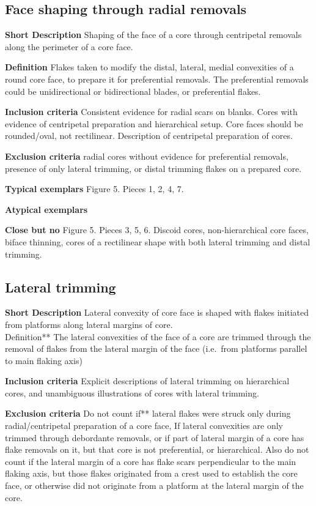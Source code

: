 \documentclass[
]{article}
\begin{document}
\hypertarget{face-shaping-through-radial-removals}{%
\subsection{Face shaping through radial
removals}\label{face-shaping-through-radial-removals}}

\textbf{Short Description} Shaping of the face of a core through
centripetal removals along the perimeter of a core face.

\textbf{Definition} Flakes taken to modify the distal, lateral, medial
convexities of a round core face, to prepare it for preferential
removals. The preferential removals could be unidirectional or
bidirectional blades, or preferential flakes.

\textbf{Inclusion criteria} Consistent evidence for radial scars on
blanks. Cores with evidence of centripetal preparation and hierarchical
setup. Core faces should be rounded/oval, not rectilinear. Description
of centripetal preparation of cores.

\textbf{Exclusion criteria} radial cores without evidence for
preferential removals, presence of only lateral trimming, or distal
trimming flakes on a prepared core.

\textbf{Typical exemplars} Figure 5. Pieces 1, 2, 4, 7.

\textbf{Atypical exemplars}

\textbf{Close but no} Figure 5. Pieces 3, 5, 6. Discoid cores,
non-hierarchical core faces, biface thinning, cores of a rectilinear
shape with both lateral trimming and distal trimming.

\hypertarget{lateral-trimming}{%
\subsection{Lateral trimming}\label{lateral-trimming}}

\textbf{Short Description} Lateral convexity of core face is shaped with
flakes initiated from platforms along lateral margins of core.\\
Definition** The lateral convexities of the face of a core are trimmed
through the removal of flakes from the lateral margin of the face
(i.e.~from platforms parallel to main flaking axis)

\textbf{Inclusion criteria} Explicit descriptions of lateral trimming on
hierarchical cores, and unambiguous illustrations of cores with lateral
trimming.

\textbf{Exclusion criteria} Do not count if** lateral flakes were struck
only during radial/centripetal preparation of a core face, If lateral
convexities are only trimmed through debordante removals, or if part of
lateral margin of a core has flake removals on it, but that core is not
preferential, or hierarchical. Also do not count if the lateral margin
of a core has flake scars perpendicular to the main flaking axis, but
those flakes originated from a crest used to establish the core face, or
otherwise did not originate from a platform at the lateral margin of the
core.
\end{document}
